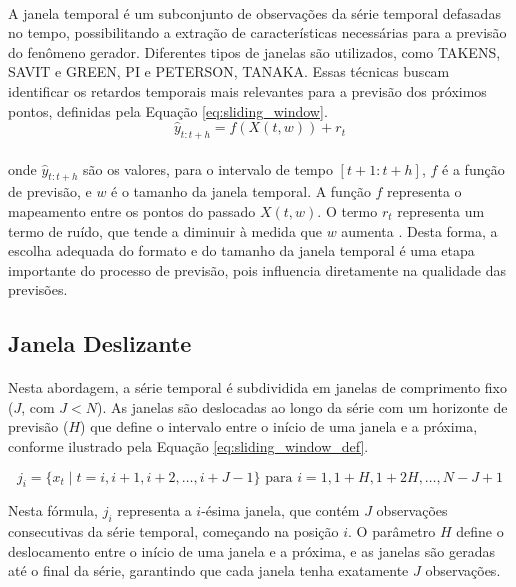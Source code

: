 \paragraph{} A janela temporal é um subconjunto de observações da série temporal defasadas no tempo, possibilitando a extração de características necessárias para a previsão do fenômeno gerador. Diferentes tipos de janelas são utilizados, como TAKENS, SAVIT e GREEN, PI e PETERSON, TANAKA. Essas técnicas buscam identificar os retardos temporais mais relevantes para a previsão dos próximos pontos, definidas pela Equação \ref{eq:sliding_window}.
\begin{equation}
	\hat{y}_{t:t+h} = f(X(t,w)) + r_t
	\label{eq:sliding_window}
\end{equation}

\paragraph{} onde \(\hat{y}_{t:t+h}\) são os valores, para o intervalo de tempo \([t + 1 : t + h]\), \(f\) é a função de
previsão, e \(w\) é o tamanho da janela temporal. A função \(f\) representa o mapeamento entre os pontos do passado \(X(t,w)\). O termo \(r_t\) representa um termo de ruído, que tende a diminuir à medida que \(w\) aumenta \cite{Yasin23}. Desta forma, a escolha adequada do formato e do tamanho da janela temporal é uma etapa importante do processo de previsão, pois influencia diretamente na qualidade das previsões.

\subsection{Janela Deslizante}
\paragraph{} Nesta abordagem, a série temporal é subdividida em janelas de comprimento fixo (\(J\), com \(J < N\)). As janelas são deslocadas ao longo da série com um horizonte de previsão (\(H\)) que define o intervalo entre o início de uma janela e a próxima, conforme ilustrado pela Equação \ref{eq:sliding_window_def}.

\begin{equation}
	j_i = \{x_t \mid t = i, i + 1, i + 2, \ldots, i + J - 1\} \text{ para } i = 1, 1 + H, 1 + 2H, \ldots, N - J + 1
	\label{eq:sliding_window_def}
\end{equation}

Nesta fórmula, \(j_i\) representa a \(i\)-ésima janela, que contém \(J\) observações consecutivas da série temporal, começando na posição \(i\). O parâmetro \(H\) define o deslocamento entre o início de uma janela e a próxima, e as janelas são geradas até o final da série, garantindo que cada janela tenha exatamente \(J\) observações.


